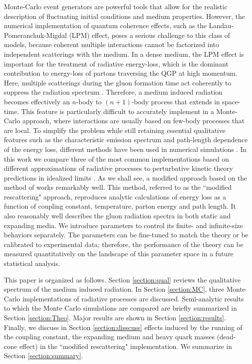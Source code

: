 \documentclass[aps, prc, reprint, amsmath, groupedaddress, nofootinbib]{revtex4-1}
\begin{document}
Monte-Carlo event generators are powerful tools that allow for the realistic description of fluctuating initial conditions and medium properties. 
However, the numerical implementation of quantum coherence effects, such as the Landau-Pomeranchuk-Migdal (LPM) effect, poses a serious challenge to this class of models, because coherent multiple interactions cannot be factorized into independent scatterings with the medium. 
In a dense medium, the LPM effect is important for the treatment of radiative energy-loss, which is the dominant contribution to energy-loss of partons traversing the QGP at high momentum.
Here, multiple scatterings during the gluon formation time act coherently to suppress the radiation spectrum \cite{PhysRev.103.1811,Wang:1994fx,Zakharov:1996fv,Zakharov:1997uu,Baier:1996kr,Baier:1996sk}.
Therefore, a medium induced radiation becomes effectively an $n$-body to $(n+1)$-body process that extends in space-time.
This feature is particularly difficult to accurately implement in a Monte-Carlo approach, where interactions are usually based on few-body processes that are local.
To simplify the problem while still retaining essential qualitative features such as the characteristic emission spectrum and path-length dependence of the energy loss, different methods have been used in numerical simulations \cite{Djordjevic:2008iz,Cao:2013ita,ColemanSmith:2012vr,Xu:2004mz,Zapp:2011ya,Gossiaux:2012cv,Park:thesis}.
In this work we compare three of the most common implementations based on different approximations of radiative processes to perturbative kinetic theory predictions in idealized limits \cite{Arnold:2002zm,Arnold:2008zu,Arnold:2009mr,Baier:1996kr,Baier:1998yf}. 
As we shall see, a modified approach based on the method of \cite{Zapp:2011ya} works remarkably well.
This method, referred to as the ``modified rescattering" approach, reproduces analytic calculations of energy loss as a function of coupling constant, temperature, parton energy and path length.
It also reasonably well describes the gluon radiation spectra in both static and expanding media.
We introduce parameters to control its finite- and infinite-size behaviors separately.
The parameters can be fine-tuned to match the theory or be calibrated to experimental data;
therefore, the performance of the theory can be measured quantitatively on the landscape of this parameter space in a future statistical analysis.

This paper is organized as follows. Section \ref{section:qual} reviews the qualitative spectrum of the medium induced radiation.
In Section \ref{section:MC}, three Monte Carlo implementations of radiative processes are discussed. 
Semi-analytic results to which the Monte Carlo simulations are compared are briefly summarized in Section \ref{section:Theo}.
Major results are shown in Section \ref{section:results}.
Finally, we discuss in Section \ref{section:disscuss} effects induced by the running of the coupling constant, the expanding medium and heavy quark masses (dead-cone effect) in the ``modified rescattering" implementation. We summarize in Section \ref{section:summary}.
\end{document}
